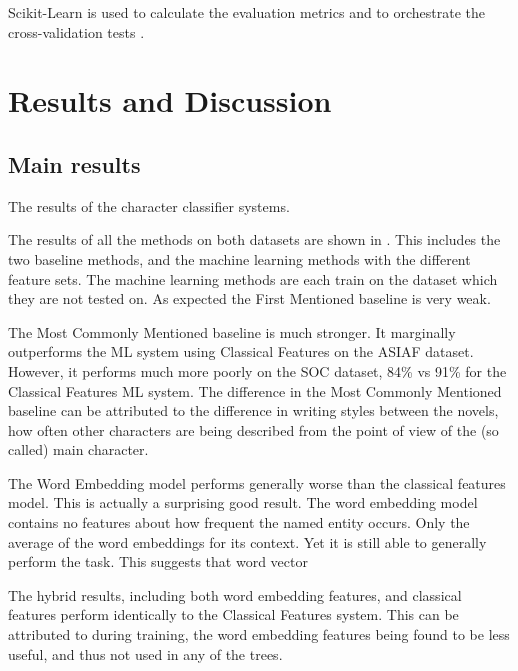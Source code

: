 \documentclass[11pt,a4paper]{article}
\newcommand{\parencite}{\citep}
\begin{document}
Scikit-Learn is used to calculate the evaluation metrics and to orchestrate the cross-validation tests \parencite{scikit-learn}.


\section{Results and Discussion}\label{sec:results-and-discussion}

\subsection{Main results}

\begin{table}
	\begin{adjustbox}{max width=\textwidth}
	\end{adjustbox}
	
	\caption{The results of the character classifier systems.} \label{tbl:resmain}
\end{table}

The results of all the methods on both datasets are shown in .
This includes the two baseline methods, and the machine learning methods with the different feature sets.
The machine learning methods are each train on the dataset which they are not tested on.
As expected the First Mentioned baseline is very weak.

The Most Commonly Mentioned baseline is much stronger.
It marginally outperforms the ML system using Classical Features on the ASIAF dataset.
However, it performs much more poorly on the SOC dataset, 84\% vs 91\% for the Classical Features ML system.
The difference in the Most Commonly Mentioned baseline can be attributed to the difference in writing styles between the novels, how often other characters are being described from the point of view of the (so called) main character.

The Word Embedding model performs generally worse than the classical features model.
This is actually a surprising good result.
The word embedding model contains no features about how frequent the named entity occurs.
Only the average of the word embeddings for its context.
Yet it is still able to generally perform the task.
This suggests that word vector 

The hybrid results, including both word embedding features, and classical features perform identically to the Classical Features system.
This can be attributed to during training, the word embedding features being found to be less useful, and thus not used in any of the trees.
\end{document}
